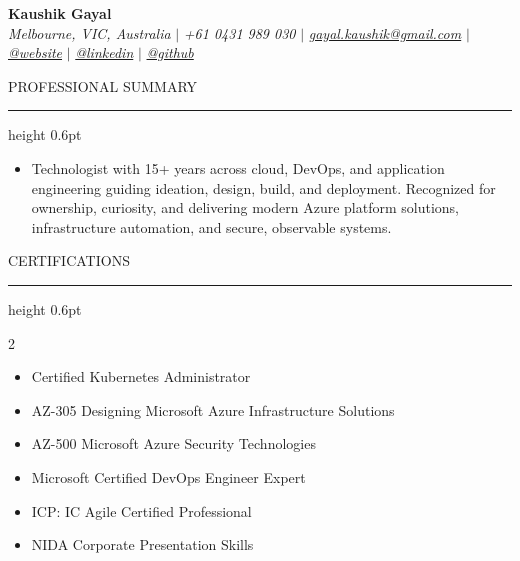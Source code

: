 \documentclass[letterpaper,10pt]{article}
\newcommand{\ResumeName}[1]{\textbf{\fontsize{18pt}{20pt}\selectfont #1}}
\newcommand{\ResumeSection}[1]{\par{\fontsize{11pt}{13pt}\selectfont \MakeUppercase{#1}}\vspace{1pt}\hrule height 0.6pt}
\begin{document}
\begin{flushleft}
    \ResumeName{Kaushik Gayal} \\
    \textit{Melbourne, VIC, Australia} $|$ 
    \textit{+61 0431 989 030} $|$  
    \href{mailto:gayal.kaushik@gmail.com}{\textit{gayal.kaushik@gmail.com}} $|$
    \href{ https://kaushik.gayal.dev }{\textit{@website}} $|$
    \href{ https://www.linkedin.com/in/kaushik-gayal-02a57316/ }{\textit{@linkedin}} $|$
    \href{ https://github.com/koshikg }{\textit{@github}}
    \vspace{-2pt}
\end{flushleft}

\ResumeSection{Professional Summary}
\vspace{-2pt}
\begin{itemize}[leftmargin=0.15in, label={}]
    \item{Technologist with 15+ years across cloud, DevOps, and application engineering guiding ideation, design, build, and deployment. Recognized for ownership, curiosity, and delivering modern Azure platform solutions, infrastructure automation, and secure, observable systems.}
\end{itemize}


\ResumeSection{Certifications}\vspace{-8pt}
\begin{multicols}{2}
\begin{itemize}[leftmargin=0.1in, itemsep=0pt, parsep=0pt, topsep=0pt]
\item {Certified Kubernetes Administrator}
\item {AZ-305 Designing Microsoft Azure Infrastructure Solutions}
\item {AZ-500 Microsoft Azure Security Technologies}
\item {Microsoft Certified DevOps Engineer Expert}
\item {ICP: IC Agile Certified Professional}
\item {NIDA Corporate Presentation Skills}
\end{itemize}
\end{multicols}
\end{document}

